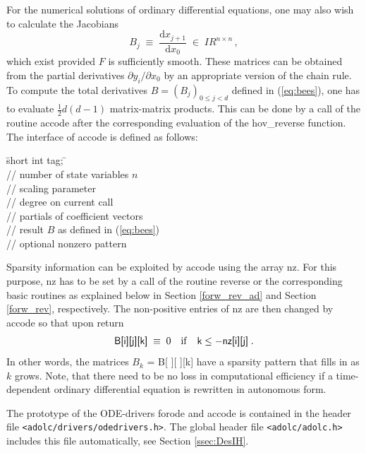 \documentclass[11pt,twoside]{article}
\begin{document}
For the numerical solutions of ordinary differential equations,
one may also wish to calculate the Jacobians
\begin{equation} 
\label{eq:bees}
B_j \; \equiv \; \frac{\mbox{d}x_{j+1}}{\mbox{d} x_0}\;\in\;{I\!\!R}^{n \times n}\, , 
\end{equation}
which exist provided $F$ is sufficiently smooth. These matrices can
be obtained from the partial derivatives $\partial y_i/\partial x_0$
by an appropriate version of the chain rule.
To compute the total derivatives $B = (B_j)_{0\leq j <d}$
defined in (\ref{eq:bees}), one has to evaluate $\frac{1}{2}d(d-1)$
matrix-matrix products. This can be done by a call of the routine {\sf accode} after the
corresponding evaluation of the {\sf hov\_reverse} function. The interface of
{\sf accode} is defined as follows: 
%
\begin{tabbing}
\hspace{0.5in}\={\sf short int tag;} \hspace{1.1in}\= \kill    %
\\
                 \> // number of state variables $n$ \\
            \> // scaling parameter\\
               \> // degree on current call\\
   \> // partials of coefficient vectors\\
   \> // result $B$ as defined in (\ref{eq:bees})\\
        \> // optional nonzero pattern 
\end{tabbing}
%
Sparsity information can be exploited by {\sf accode} using the array {\sf
nz}. For this purpose, {\sf nz} has to be set by a call of the routine {\sf
reverse} or the corresponding basic routines as explained below in
Section \ref{forw_rev_ad} and Section \ref{forw_rev}, respectively. The
non-positive entries of {\sf nz} are then changed by {\sf accode} so that upon
return 
\[
  \mbox{{\sf B[i][j][k]}} \; \equiv \; 0 \quad {\rm if} \quad \mbox{\sf k} \leq \mbox{\sf $-$nz[i][j]}\; . 
\]
In other words, the matrices $B_k$ = {\sf B[ ][ ][k]} have a
sparsity pattern that fills in as $k$ grows. Note, that there need to be no
loss in computational efficiency if a time-dependent ordinary differential equation 
is rewritten in autonomous form. 

The prototype of the ODE-drivers {\sf forode} and {\sf accode} is contained in the header file
\verb=<adolc/drivers/odedrivers.h>=. The global header file
\verb=<adolc/adolc.h>= 
includes this file automatically, see Section \ref{ssec:DesIH}.
\end{document}
